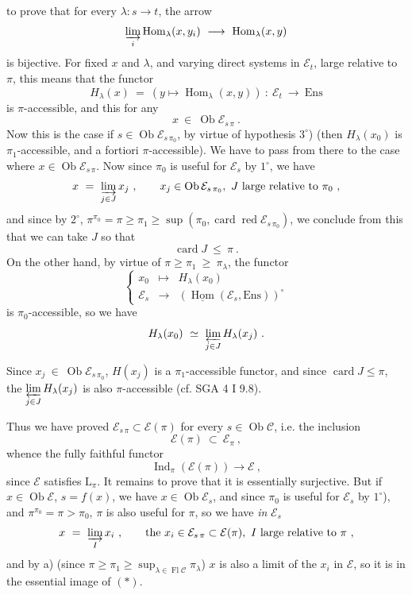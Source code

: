 \documentclass[11pt]{article}
\newcommand{\printedpage}[1]{\marginpar{\footnotesize p.~#1}}
\newcommand{\msp}[1]{\marginpar{\footnotesize [#1]}}
\newcommand{\cE}{\mathcal{E}}
\newcommand{\cC}{\mathcal{C}}
\newcommand{\Ob}{\operatorname{Ob}}
\newcommand{\Fl}{\operatorname{Fl}}
\newcommand{\Hom}{\operatorname{Hom}}
\newcommand{\Ind}{\operatorname{Ind}}
\newcommand{\card}{\operatorname{card}}
\newcommand{\red}{\operatorname{\text{red}}}
\newcommand{\Ens}{\mathrm{Ens}}
\begin{document}
\printedpage{164}

\msp{page 430}to prove that for every $\lambda : s \longrightarrow t$, the arrow
\[
\varinjlim_{i} \Hom_{\lambda}(x, y_i) \ \longrightarrow \ \Hom_{\lambda}(x, y)
\]
is bijective. For fixed $x$ and $\lambda$, and varying direct systems in $\cE_t$, large relative to $\pi$, this means that the functor
\[
H_{\lambda}(x) \ = \ (y \longmapsto \Hom_{\lambda}(x, y)) \ : \ \cE_t \ \longrightarrow \ \Ens
\]
is $\pi$-accessible, and this for any
\[
x \ \in \ \Ob \cE_{s\,\pi} \ .
\]
Now this is the case if $s \in \Ob \cE_{s\,\pi_0}$, by virtue of hypothesis $3^{\circ}$) (then $H_{\lambda}(x_0)$ is $\pi_1$-accessible, %
and a fortiori $\pi$-accessible). We have to pass from there to the case where $x \in \Ob \cE_{s\,\pi}$. Now since $\pi_0$ is useful for $\cE_s$ by $1^{\circ}$, we have
\[
x \ = \ \varinjlim_{j \in J} x_j \ , \qquad x_j \in \Ob \cE_{s\,\pi_0},\ J \text{ large relative to } \pi_0 \ ,
\]
and since by $2^{\circ}$, $\pi^{\pi_0} = \pi \geqslant \pi_1 \geqslant \sup(\pi_0, \card \red \cE_{s\,\pi_0})$, we conclude from this that we can take $J$ so that
\[
\card J \ \leqslant \ \pi \ .
\]
On the other hand, by virtue of $\pi \geqslant \pi_1 \ \geqslant \ \pi_{\lambda}$, the functor
\[
\left\{
\begin{array}{lcl}
x_0 & \longmapsto & H_{\lambda}(x_0) \\[1ex]
\cE_s & \longrightarrow & (\underline{\Hom}(\cE_s, \Ens))^{\circ}
\end{array}
\right.
\]
is $\pi_0$-accessible, so we have
\[
H_{\lambda}(x_0) \ \simeq \ \varprojlim_{j \in J} H_{\lambda}(x_j) \ .
\]

\msp{page 431}Since $x_j \ \in \ \Ob \cE_{s\,\pi_0}$, $H(x_j)$ is a $\pi_1$-accessible functor, and since $\card J \leqslant \pi$, the $\varprojlim\limits_{j \in J} H_{\lambda}(x_j)$ is also $\pi$-accessible (cf. SGA 4 I 9.8).

Thus we have proved $\cE_{s\,\pi} \subset \cE(\pi)$ for every $s \in \Ob \cC$, i.e. the inclusion
\[
\cE(\pi) \ \subset \ \cE_{\pi} \ ,
\]
whence the fully faithful functor
\[
\Ind_{\pi}(\cE(\pi)) \longrightarrow \cE \ , \tag*{$(*)$}
\]
since $\cE$ satisfies $\mathrm{L}_{\pi}$. It remains to prove that it is essentially surjective. But if $x \in \Ob \cE$, $s = f(x)$, we have $x \in \Ob \cE_s$, and since $\pi_0$ is useful for $\cE_s$ by $1^{\circ}$), and $\pi^{\pi_0} = \pi > \pi_0$,
$\pi$ is also useful for $\pi$, so we have \textit{in} $\cE_s$ %
\[
x \ = \ \varinjlim_{I} x_i \ , \qquad \text{the } x_i \in \cE_{s\,\pi} \subset \cE(\pi),\ I \text{ large relative to } \pi \ ,
\]
\printedpage{165}
and by a) (since $\pi \geqslant \pi_1 \geqslant \sup_{\lambda \in \Fl \cC} \pi_{\lambda}$) $x$ is also a limit of the $x_i$ in $\cE$, so it is in the essential image of $(*)$.
\end{document}
